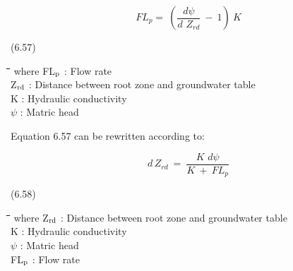 \documentclass[11pt]{article}
\begin{document}
\begin{displaymath}
FL _{p} =~({\frac{d \psi }{ d\,\, Z _{rd} }} ~-~ 1)~K
\end{displaymath}

 \bigskip
\strut\hfill (6.57)

\nwln
\begin{tabbing}
\hspace{1.27cm}\=\hspace{1.27cm}\=\hspace{1.27cm}\=\hspace{1.27cm}\=%
\hspace{1.27cm}\=\hspace{1.27cm}\=\hspace{1.27cm}\=\hspace{1.27cm}\=%
\hspace{1.27cm}\=\hspace{1.27cm}\=\kill
where\> FL$_{{\rm p}}$\> : Flow rate\> \> \> \> \> \> \> \> [cm d$^{{\rm -1}}$]\\
\>Z$_{{\rm rd}}$\> : Distance between root zone and groundwater table\> \> \> \> \> \> \> \> [cm]\\
\>K\> : Hydraulic conductivity\> \> \> \> \> \> \> \> [cm d$^{{\rm -1}}$]\\
\>$\psi$\> : Matric head\> \> \> \> \> \> \> \> [cm]
\end{tabbing}

\bigskip
Equation 6.57 can be rewritten according to:

\begin{displaymath}
d\, Z _{rd} ~=~{\frac{K\,\, d \psi }{ K ~+~ FL _{p} }}
\end{displaymath}

 \bigskip
\strut\hfill (6.58)

\nwln
\begin{tabbing}
\hspace{1.27cm}\=\hspace{1.27cm}\=\hspace{1.27cm}\=\hspace{1.27cm}\=%
\hspace{1.27cm}\=\hspace{1.27cm}\=\hspace{1.27cm}\=\hspace{1.27cm}\=%
\hspace{1.27cm}\=\hspace{1.27cm}\=\kill
where\> Z$_{{\rm rd}}$\> : Distance between root zone and groundwater table\> \> \> \> \> \> \> \> [cm]\\
\>K\> : Hydraulic conductivity\> \> \> \> \> \> \> \> [cm d$^{{\rm -1}}$]\\
\>$\psi$\> : Matric head\> \> \> \> \> \> \> \> [cm]\\
\>FL$_{{\rm p}}$\> : Flow rate\> \> \> \> \> \> \> \> [cm d$^{{\rm -1}}$]
\end{tabbing}
\end{document}
